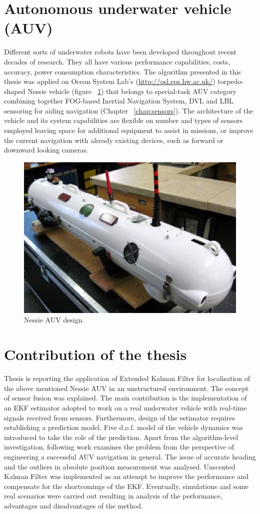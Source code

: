 \section{Autonomous underwater vehicle (AUV)}
Different sorts of underwater robots have been developed throughout recent decades of research. They all have various performance capabilities, costs, accuracy, power consumption characteristics. The algorithm presented in this thesis was applied on Ocean System Lab's (\url{http://osl.eps.hw.ac.uk/}) torpedo-shaped Nessie vehicle (figure ~\ref{fig:nessie6}) that belongs to special-task AUV category combining together FOG-based Inertial Navigation System, DVL and LBL sensoring for aiding navigation (Chapter ~\ref{chap:sensors}). The architecture of the vehicle and its system capabilities are flexible on number and types of sensors employed leaving space for additional equipment to assist in missions, or improve the current navigation with already existing devices, such as forward or downward looking cameras. 
\begin{figure}%
\centering
\includegraphics[width=0.5\linewidth]{intro/fig/nessie6.eps}
\caption{Nessie AUV design.}
\label{fig:nessie6}
\end{figure} 

\section{Contribution of the thesis}
Thesis is reporting the application of Extended Kalman Filter for localisation of the above mentioned Nessie AUV in an unstructured environment. The concept of sensor fusion was explained. The main contribution is the implementation of an EKF estimator adopted to work on a real underwater vehicle with real-time signals received from sensors. Furthermore, design of the estimator requires establishing a prediction model. Five d.o.f. model of the vehicle dynamics was introduced to take the role of the prediction. Apart from the algorithm-level investigation, following work examines the problem from the perspective of engineering a successful AUV navigation in general. The issue of accurate heading and the outliers in absolute position measurement  was analysed. Unscented Kalman Filter was implemented as an attempt to improve the performance and compensate for the shortcomings of the EKF. Eventually, simulations and some real scenarios were carried out resulting in analysis of the performance, advantages and disadvantages of the method. 

